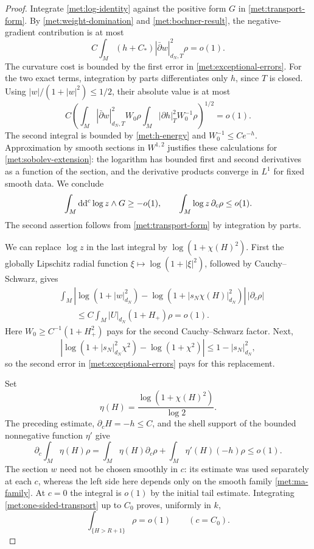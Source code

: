 \begin{proof}
Integrate \eqref{met:log-identity} against the positive form \(G\)
in \eqref{met:transport-form}.  By
\eqref{met:weight-domination} and \eqref{met:bochner-result}, the
negative-gradient contribution is at most
\[
 C\int_M(h+C_*)|\bar\partial w|_{d_N,T}^2\rho=o(1).
\]
The curvature cost is bounded by the first error in
\eqref{met:exceptional-errors}.  For the two exact terms, integration
by parts differentiates only \(h\), since \(T\) is closed.  Using
\(|w|/(1+|w|^2)\leq1/2\), their absolute value is at most
\begin{equation}
 \label{met:log-exact-errors}
 C\left(
   \int_M|\bar\partial w|_{d_N,T}^2W_0\rho
   \int_M|\partial h|_T^2W_0^{-1}\rho
       \right)^{1/2}=o(1).
\end{equation}
The second integral is bounded by \eqref{met:h-energy} and
\(W_0^{-1}\leq C e^{-h}\).  Approximation by smooth sections in
\(W^{1,2}\) justifies these calculations for
\eqref{met:sobolev-extension}: the logarithm has bounded first and
second derivatives as a function of the section, and the derivative
products converge in \(L^1\) for fixed smooth data.  We conclude
\begin{equation}
 \label{met:log-integral}
 \int_M\mathrm{d}\mathrm{d}^{c}\log z\wedge G\geq-o(1),
 \qquad
 \int_M\log z\,\partial_c\rho\leq o(1).
\end{equation}
The second assertion follows from \eqref{met:transport-form} by
integration by parts.

We can replace \(\log z\) in the last integral by
\(\log(1+\chi(H)^2)\).  First the globally Lipschitz radial function
\(\xi\mapsto\log(1+|\xi|^2)\), followed by Cauchy--Schwarz, gives
\begin{align*}
 &\int_M\left|
 \log(1+|w|_{d_N}^2)
 -\log(1+|s_N\chi(H)|_{d_N}^2)\right|\,|\partial_c\rho|\\
 &\hspace{2em}\leq
 C\int_M|U|_{d_N}(1+H_+)\rho=o(1).
\end{align*}
Here \(W_0\geq C^{-1}(1+H_+^2)\) pays for the second
Cauchy--Schwarz factor.  Next,
\[
 \left|\log(1+|s_N|_{d_N}^2\chi^2)-\log(1+\chi^2)\right|
 \leq1-|s_N|_{d_N}^2,
\]
so the second error in \eqref{met:exceptional-errors} pays for this
replacement.

Set
\[
 \eta(H)=\frac{\log(1+\chi(H)^2)}{\log2}.
\]
The preceding estimate, \(\partial_cH=-h\leq C\), and the shell
support of the bounded nonnegative function \(\eta'\) give
\begin{equation}
 \label{met:one-sided-transport}
 \partial_c\int_M\eta(H)\rho
 =\int_M\eta(H)\partial_c\rho
       +\int_M\eta'(H)(-h)\rho
 \leq o(1).
\end{equation}
The section \(w\) need not be chosen smoothly in \(c\): its estimate
was used separately at each \(c\), whereas the left side here
depends only on the smooth family \eqref{met:ma-family}.
At \(c=0\) the integral is \(o(1)\) by the initial tail estimate.
Integrating \eqref{met:one-sided-transport} up to \(C_0\) proves,
uniformly in \(k\),
\begin{equation}
 \label{met:endpoint-tail}
 \int_{\{H>R+1\}}\rho=o(1)
 \qquad(c=C_0).
\end{equation}


\end{proof}
